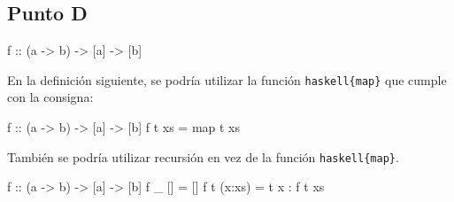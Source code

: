 \documentclass{article}
\begin{document}
\subsection*{Punto D}
\begin{haskell}
f :: (a -> b) -> [a] -> [b]
\end{haskell}
    
    En la definición siguiente, se podría utilizar la función \verb|haskell{map}| que cumple con la consigna:
\begin{haskell}
f :: (a -> b) -> [a] -> [b]
f t xs = map t xs
\end{haskell}
    
    También se podría utilizar recursión en vez de la función \verb|haskell{map}|.
\begin{haskell}
f :: (a -> b) -> [a] -> [b] 
f _ [] = [] 
f t (x:xs) = t x : f t xs
\end{haskell}
    
\end{document}
